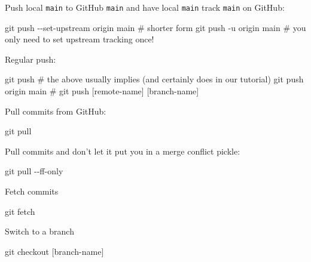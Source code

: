\documentclass[
]{book}
\newenvironment{Shaded}{\begin{snugshade}}{\end{snugshade}}
\newcommand{\NormalTok}[1]{#1}
\begin{document}
Push local \texttt{main} to GitHub \texttt{main} and have local \texttt{main} track \texttt{main} on GitHub:

\begin{Shaded}
\begin{Highlighting}[]
\NormalTok{git push {-}{-}set{-}upstream origin main}
\NormalTok{\# shorter form}
\NormalTok{git push {-}u origin main}
\NormalTok{\# you only need to set upstream tracking once!}
\end{Highlighting}
\end{Shaded}

Regular push:

\begin{Shaded}
\begin{Highlighting}[]
\NormalTok{git push }
\NormalTok{\# the above usually implies (and certainly does in our tutorial)}
\NormalTok{git push origin main}
\NormalTok{\# git push [remote{-}name] [branch{-}name]}
\end{Highlighting}
\end{Shaded}

Pull commits from GitHub:

\begin{Shaded}
\begin{Highlighting}[]
\NormalTok{git pull}
\end{Highlighting}
\end{Shaded}

Pull commits and don't let it put you in a merge conflict pickle:

\begin{Shaded}
\begin{Highlighting}[]
\NormalTok{git pull {-}{-}ff{-}only}
\end{Highlighting}
\end{Shaded}

Fetch commits

\begin{Shaded}
\begin{Highlighting}[]
\NormalTok{git fetch}
\end{Highlighting}
\end{Shaded}

Switch to a branch

\begin{Shaded}
\begin{Highlighting}[]
\NormalTok{git checkout [branch{-}name]}
\end{Highlighting}
\end{Shaded}
\end{document}
